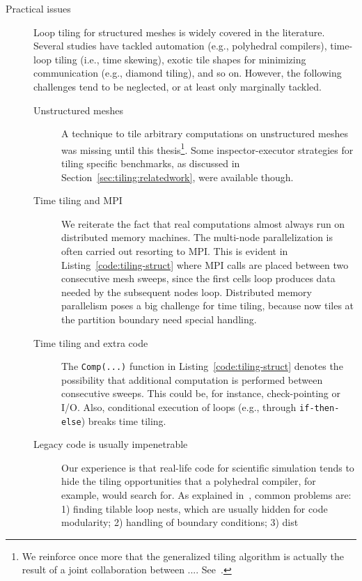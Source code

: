 \begin{description}
\item[Practical issues] Loop tiling for structured meshes is widely covered in the literature. Several studies have tackled automation (e.g., polyhedral compilers), time-loop tiling (i.e., time skewing), exotic tile shapes for minimizing communication (e.g., diamond tiling), and so on. However, the following challenges tend to be neglected, or at least only marginally tackled.
\begin{description}
\item[Unstructured meshes] A technique to tile arbitrary computations on unstructured meshes was missing until this thesis\footnote{We reinforce once more that the generalized tiling algorithm is actually the result of a joint collaboration between .... See~\cite{st-paper}.}. Some inspector-executor strategies for tiling specific benchmarks, as discussed in Section~\ref{sec:tiling:relatedwork}, were available though. 
\item[Time tiling and MPI] We reiterate the fact that real computations almost always run on distributed memory machines. The multi-node parallelization is often carried out resorting to MPI. This is evident in Listing~\ref{code:tiling-struct} where MPI calls are placed between two consecutive mesh sweeps, since the first cells loop produces data needed by the subsequent nodes loop. Distributed memory parallelism poses a big challenge for time tiling, because now tiles at the partition boundary need special handling.
\item[Time tiling and extra code] The \texttt{Comp(...)} function in Listing~\ref{code:tiling-struct} denotes the possibility that additional computation is performed between consecutive sweeps. This could be, for instance, check-pointing or I/O. Also, conditional execution of loops (e.g., through \texttt{if-then-else}) breaks time tiling. 
\item[Legacy code is usually impenetrable] Our experience is that real-life code for scientific simulation tends to hide the tiling opportunities that a polyhedral compiler, for example, would search for. As explained in~\cite{strout-common-problems}, common problems are: 1) finding tilable loop nests, which are usually hidden for code modularity; 2) handling of boundary conditions; 3) dist
\end{description}


\end{description}
